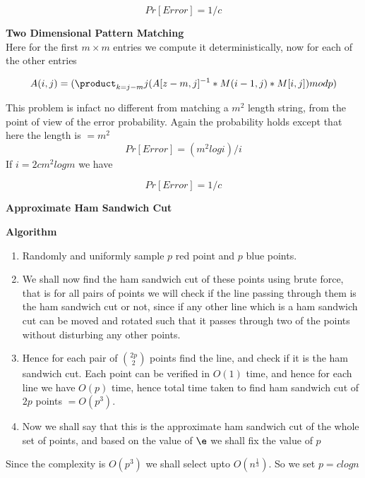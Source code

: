 \documentclass{assignment}
\begin{document}
\begin{problemlist}
\begin{problem}
\begin{answer}
\begin{equation}
 Pr[Error] =1/c
\end{equation}
 
\textbf{Two Dimensional Pattern Matching} \\

Here for the first $m \times m$ entries we compute it deterministically, now for each of the other entries

\begin{equation}
 A(i,j) = (\product_{k=j-m}{j}(A[z-m,j]^{-1} * M(i-1,j) * M[i,j] ) mod p)
\end{equation}

This problem is infact no different from matching a $m^2$ length string, from the point of view of the error probability. 
Again the probability holds except that here the length is $= m^2$
\begin{equation}
 Pr[Error] =(m^2 log i )/i 
\end{equation}
If $i=2cm^2logm$ we have 

\begin{equation}
 Pr[Error] =1/c
\end{equation}
\end{answer}
\end{problem}
\pbitem
\begin{problem}
\textbf{Approximate Ham Sandwich Cut}
\begin{answer}
\textbf{Algorithm} \\
\begin{enumerate}
\item Randomly and uniformly sample $p$ red point and $p$ blue points.
\item We shall now find the ham sandwich cut of these points using brute force, that is for all pairs of points we will check if the line passing through them is the ham sandwich cut or not, since if any other line which is a ham sandwich cut can be moved and rotated such that it passes through two of the points without disturbing any other points. \\
\item Hence for each pair of $\binom{2p}{2}$ points find the line, and check if it is the ham sandwich cut. Each point can be verified in $O(1)$ time, and hence for each line we have $O(p)$ time, hence total time taken to find ham sandwich cut of $2p$ points $=O(p^3)$. 
\item Now we shall say that this is the approximate ham sandwich cut of the whole set of points, and based on the value of $\e$ we shall fix the value of  $p$
\end{enumerate}
Since the complexity is $O(p^3)$ we shall select upto $O(n^\frac{1}{3})$. So we set $p=clog n$ 


\end{answer}
\end{problem}
\end{problemlist}
\end{document}
